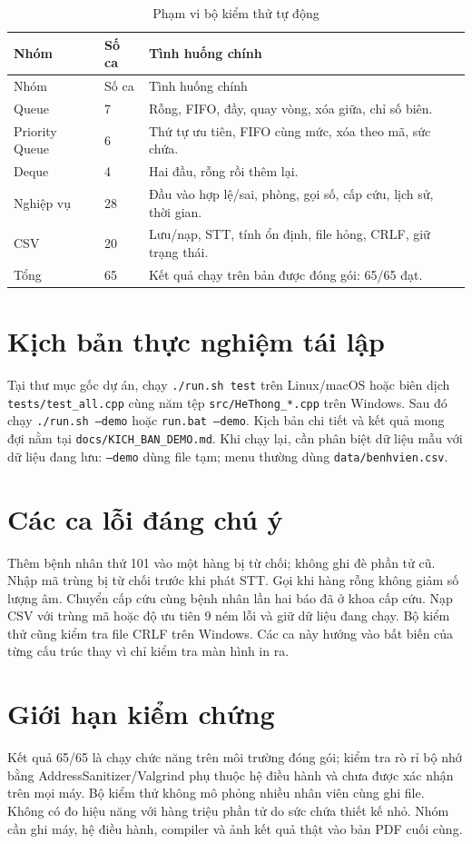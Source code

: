 \documentclass[12pt,a4paper,oneside]{report}
\begin{document}
\begin{longtable}{p{2.4cm}p{1.8cm}p{8.3cm}}
\caption{Phạm vi bộ kiểm thử tự động}\\\toprule
Nhóm & Số ca & Tình huống chính\\\midrule\endfirsthead
\toprule Nhóm & Số ca & Tình huống chính\\\midrule\endhead
Queue & 7 & Rỗng, FIFO, đầy, quay vòng, xóa giữa, chỉ số biên.\\
Priority Queue & 6 & Thứ tự ưu tiên, FIFO cùng mức, xóa theo mã, sức chứa.\\
Deque & 4 & Hai đầu, rỗng rồi thêm lại.\\
Nghiệp vụ & 28 & Đầu vào hợp lệ/sai, phòng, gọi số, cấp cứu, lịch sử, thời gian.\\
CSV & 20 & Lưu/nạp, STT, tính ổn định, file hỏng, CRLF, giữ trạng thái.\\\midrule
Tổng & 65 & Kết quả chạy trên bản được đóng gói: 65/65 đạt.\\\bottomrule
\end{longtable}

\section{Kịch bản thực nghiệm tái lập}
Tại thư mục gốc dự án, chạy \texttt{./run.sh test} trên Linux/macOS hoặc biên dịch \texttt{tests/test\_all.cpp} cùng năm tệp \texttt{src/HeThong\_*.cpp} trên Windows. Sau đó chạy \texttt{./run.sh --demo} hoặc \texttt{run.bat --demo}. Kịch bản chi tiết và kết quả mong đợi nằm tại \texttt{docs/KICH\_BAN\_DEMO.md}. Khi chạy lại, cần phân biệt dữ liệu mẫu với dữ liệu đang lưu: \texttt{--demo} dùng file tạm; menu thường dùng \texttt{data/benhvien.csv}.

\section{Các ca lỗi đáng chú ý}
Thêm bệnh nhân thứ 101 vào một hàng bị từ chối; không ghi đè phần tử cũ. Nhập mã trùng bị từ chối trước khi phát STT. Gọi khi hàng rỗng không giảm số lượng âm. Chuyển cấp cứu cùng bệnh nhân lần hai báo đã ở khoa cấp cứu. Nạp CSV với trùng mã hoặc độ ưu tiên 9 ném lỗi và giữ dữ liệu đang chạy. Bộ kiểm thử cũng kiểm tra file CRLF trên Windows. Các ca này hướng vào bất biến của từng cấu trúc thay vì chỉ kiểm tra màn hình in ra.

\section{Giới hạn kiểm chứng}
Kết quả 65/65 là chạy chức năng trên môi trường đóng gói; kiểm tra rò rỉ bộ nhớ bằng AddressSanitizer/Valgrind phụ thuộc hệ điều hành và chưa được xác nhận trên mọi máy. Bộ kiểm thử không mô phỏng nhiều nhân viên cùng ghi file. Không có đo hiệu năng với hàng triệu phần tử do sức chứa thiết kế nhỏ. Nhóm cần ghi máy, hệ điều hành, compiler và ảnh kết quả thật vào bản PDF cuối cùng.
\end{document}
